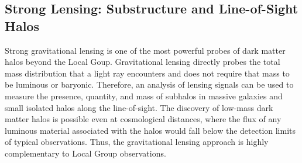 









\subsection{Strong Lensing: Substructure and Line-of-Sight Halos }
\label{sec:stronglens} 

Strong gravitational lensing is one of the most powerful probes of dark matter halos beyond the Local Goup. 
Gravitational lensing directly probes the total mass distribution that a light ray encounters and does not require that mass to be luminous or baryonic.
Therefore, an analysis of lensing signals can be used to measure the presence, quantity, and mass of subhalos in massive galaxies and small isolated halos along the line-of-sight.  
The discovery of low-mass dark matter halos is possible even at cosmological distances, where the flux of any luminous material associated with the halos would fall below the detection limits of typical observations.  
Thus, the gravitational lensing approach is highly complementary to Local Group observations.

